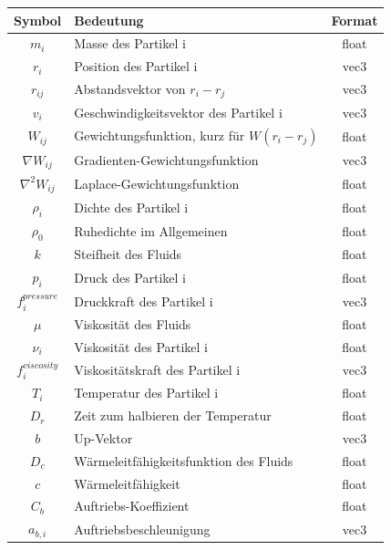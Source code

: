 \documentclass[intern,palatino]{cgBA}
\begin{document}
\begin{figure}
	\begin{center}
		\begin{tabular}{ | c | p{8cm} | c |}
			\hline
			Symbol & Bedeutung & Format  \\ \hline
			$m_i $ 				&  Masse des Partikel i								&	float	\\ \hline
			$r_i $		 		&  Position des Partikel i							&	vec3	\\ \hline
			$r_{ij}$ 			&  Abstandsvektor von $r_i - r_j$					&	vec3	\\ \hline
			$v_i$	 			&  Geschwindigkeitsvektor des Partikel i			&	vec3	\\ \hline
			$W_{ij} $ 			&  Gewichtungsfunktion, kurz für $W (r_i - r_j)$	&	float	\\ \hline
			$\nabla W_{ij} $ 	&  Gradienten-Gewichtungsfunktion					&	vec3	\\ \hline
			$\nabla^2 W_{ij} $ 	&  Laplace-Gewichtungsfunktion						&	float	\\ \hline
			$\rho_i $ 			&  Dichte des Partikel i		 					&	float	\\ \hline
			$\rho_0 $ 			&  Ruhedichte im Allgemeinen						&	float	\\ \hline
			$k $ 				&  Steifheit des Fluids			 					&	float	\\ \hline
			$p_i $ 				&  Druck des Partikel i								&	float	\\ \hline
			$f^{pressure}_i $	&  Druckkraft des Partikel i						&	vec3	\\ \hline
			$\mu $ 				&  Viskosität des Fluids							&	float	\\ \hline
			$\nu_i $ 			&  Viskosität des Partikel i						&	float	\\ \hline
			$f^{viscosity}_i $ 	&  Viskositätskraft des Partikel i					&	vec3	\\ \hline
			$T_i $ 				&  Temperatur des Partikel i						&	float	\\ \hline
			$D_r $ 				&  Zeit zum halbieren der Temperatur				&	float	\\ \hline
			$b $ 				&  Up-Vektor										&	vec3	\\ \hline
			$D_c $ 				&  Wärmeleitfähigkeitsfunktion des Fluids			&	float	\\ \hline
			$c $ 				&  Wärmeleitfähigkeit								&	float	\\ \hline
			$C_b $ 				&  Auftriebs-Koeffizient							&	float	\\ \hline
			$a_{b,i} $ 	  		&  Auftriebsbeschleunigung							&	vec3	\\ \hline

\end{tabular}
\end{center}
\end{figure}
\end{document}
